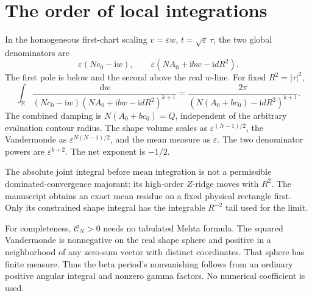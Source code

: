 \documentclass[11pt]{article}
\numberwithin{equation}{section}
\theoremstyle{definition}
\newcommand{\dd}{\,\mathrm d}
\newcommand{\ii}{\mathrm i}
\newcommand{\R}{\mathbb R}
\newcommand{\eps}{\varepsilon}
\begin{document}


\section{The order of local integrations}\label{app:local}
In the homogeneous first-chart scaling \(v=\eps w\),
\(t=\sqrt\eps\,\tau\), the two global denominators are
\[
 \eps(Nc_0-\ii w),\qquad
 \eps(NA_0+\ii bw-\ii dR^2).
\]
The first pole is below and the second above the real \(w\)-line.
For fixed \(R^2=|\tau|^2\),
\[
 \int_\R
 \frac{\dd w}{(Nc_0-\ii w)(NA_0+\ii bw-\ii dR^2)^{k+1}}
 =\frac{2\pi}{(N(A_0+bc_0)-\ii dR^2)^{k+1}}.
\]
The combined damping is \(N(A_0+bc_0)=Q\), independent of the arbitrary
evaluation contour radius. The shape volume scales as
\(\eps^{(N-1)/2}\), the Vandermonde as
\(\eps^{N(N-1)/2}\), and the mean measure as \(\eps\).
The two denominator powers are \(\eps^{k+2}\).
The net exponent is \(-1/2\).

The absolute joint integral before mean integration is not a permissible
dominated-convergence majorant: its high-order \(Z\)-ridge moves with
\(R^2\). The manuscript obtains an exact mean residue on a fixed physical
rectangle first. Only its constrained shape integral has the integrable
\(R^{-2}\) tail used for the limit.

For completeness, \(\mathscr C_N>0\) needs no tabulated Mehta formula.
The squared Vandermonde is nonnegative on the real shape sphere and
positive in a neighborhood of any zero-sum vector with distinct
coordinates. That sphere has finite measure. Thus the beta period's
nonvanishing follows from an ordinary positive angular integral and
nonzero gamma factors. No numerical coefficient is used.
\end{document}
